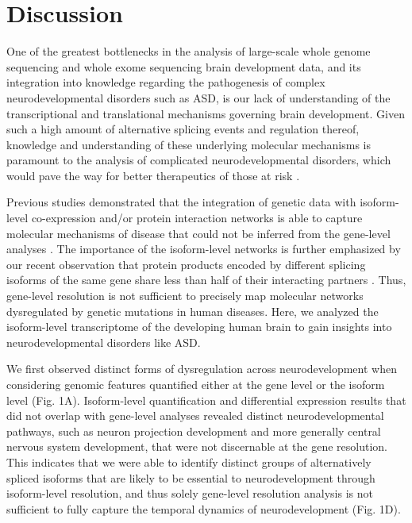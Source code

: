 \documentclass[12pt,chapterheads,final]{ucsd}
\begin{document}
\chapter{Discussion}
One of the greatest bottlenecks in the analysis of large-scale whole genome sequencing and whole exome sequencing brain development data, and its integration into knowledge regarding the pathogenesis of complex neurodevelopmental disorders such as ASD, is our lack of understanding of the transcriptional and translational mechanisms governing brain development. Given such a high amount of alternative splicing events and regulation thereof, knowledge and understanding of these underlying molecular mechanisms is paramount to the analysis of complicated neurodevelopmental disorders, which would pave the way for better therapeutics of those at risk \cite{Mele2015,Raj2015}. \par
Previous studies demonstrated that the integration of genetic data with isoform-level co-expression and/or protein interaction networks is able to capture molecular mechanisms of disease that could not be inferred from the gene-level analyses \cite{Corominas2014,Irimia2014}. The importance of the isoform-level networks is further emphasized by our recent observation that protein products encoded by different splicing isoforms of the same gene share less than half of their interacting partners \cite{Yang2016}. Thus, gene-level resolution is not sufficient to precisely map molecular networks dysregulated by genetic mutations in human diseases. Here, we analyzed the isoform-level transcriptome of the developing human brain to gain insights into neurodevelopmental disorders like ASD. \par
We first observed distinct forms of dysregulation across neurodevelopment when considering genomic features quantified either at the gene level or the isoform level (Fig. 1A). Isoform-level quantification and differential expression results that did not overlap with gene-level analyses revealed distinct neurodevelopmental pathways, such as neuron projection development and more generally central nervous system development, that were not discernable at the gene resolution. This indicates that we were able to identify distinct groups of alternatively spliced isoforms that are likely to be essential to neurodevelopment through isoform-level resolution, and thus solely gene-level resolution analysis is not sufficient to fully capture the temporal dynamics of neurodevelopment (Fig. 1D). \par
\end{document}
